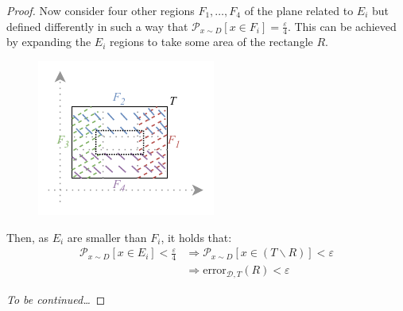 \begin{example}
\begin{theorem}
\begin{proof}
            Now consider four other regions $F_1, \dots, F_4$ of the plane related to $E_i$ but defined differently
            in such a way that $\mathcal{P}_{x \sim D}[x \in F_i] = \frac{\varepsilon}{4}$.
            This can be achieved by expanding the $E_i$ regions to take some area of the rectangle $R$.
            \begin{figure}[H]
                \centering
                \includegraphics[width=0.4\linewidth]{./img/_rectangle_space2.pdf}
            \end{figure}

            Then, as $E_i$ are smaller than $F_i$, it holds that:
            \[ 
                \begin{split}
                    \mathcal{P}_{x \sim D}[x \in E_i] < \frac{\varepsilon}{4} &\Rightarrow \mathcal{P}_{x \sim D}[x \in (T \smallsetminus R)] < \varepsilon \\
                    & \Rightarrow \text{error}_{\mathcal{D}, T}(R) < \varepsilon
                \end{split}
            \]
            
            \textit{To be continued\dots}
        \end{proof}
    \end{theorem}
\end{example}
